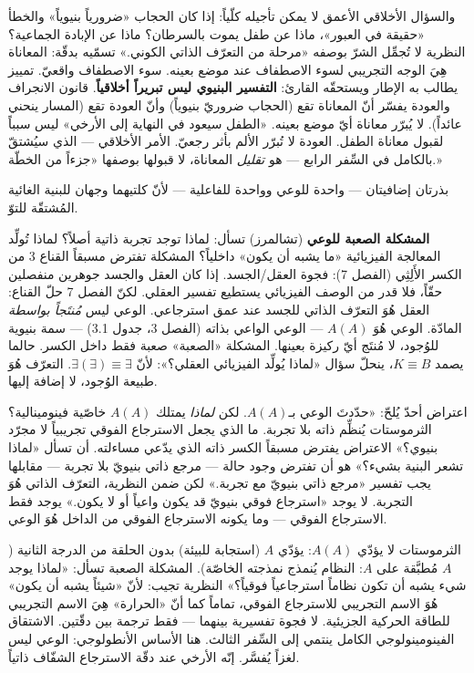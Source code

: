 \documentclass[10pt, openany, oneside]{book}
\begin{document}
والسؤال الأخلاقي الأعمق لا يمكن تأجيله كلّياً: إذا كان الحجاب «ضرورياً بنيوياً» والخطأ «حقيقة في العبور»، ماذا عن طفل يموت بالسرطان؟ ماذا عن الإبادة الجماعية؟ النظرية لا تُجمِّل الشرّ بوصفه «مرحلة من التعرّف الذاتي الكوني.» تسمّيه بدقّة: المعاناة هِيَ الوجه التجريبي لسوء الاصطفاف عند موضع بعينه. سوء الاصطفاف واقعيّ. تمييز يطالب به الإطار ويستحقّه القارئ: \textbf{التفسير البنيوي ليس تبريراً أخلاقياً}. قانون الانجراف والعودة يفسّر أنّ المعاناة تقع (الحجاب ضروريّ بنيوياً) وأنّ العودة تقع (المسار ينحني عائداً). لا يُبرّر معاناة أيّ موضع بعينه. «الطفل سيعود في النهاية إلى الأرخي» ليس سبباً لقبول معاناة الطفل. العودة لا تُبرّر الألم بأثر رجعيّ. الأمر الأخلاقي --- الذي سيُشتقّ بالكامل في السِّفر الرابع --- هو \textit{تقليل} المعاناة، لا قبولها بوصفها «جزءاً من الخطّة.»

\vspace{1.5em}

بذرتان إضافيتان --- واحدة للوعي وواحدة للفاعلية --- لأنّ كلتيهما وجهان للبنية الغائية المُشتقّة للتوّ.

\textbf{المشكلة الصعبة للوعي} (تشالمرز) تسأل: لماذا توجد تجربة ذاتية أصلاً؟ لماذا تُولِّد المعالجة الفيزيائية «ما يشبه أن يكون» داخلياً؟ المشكلة تفترض مسبقاً القناع 3 من الكسر الأَلِثِي (الفصل 7): فجوة العقل/الجسد. إذا كان العقل والجسد جوهرين منفصلين حقّاً، فلا قدر من الوصف الفيزيائي يستطيع تفسير العقلي. لكنّ الفصل 7 حلّ القناع: العقل هُوَ التعرّف الذاتي للجسد عند عمق استرجاعي. الوعي ليس \textit{مُنتَجاً بواسطة} المادّة. الوعي هُوَ $A(A)$ --- الوعي الواعي بذاته (الفصل 3، جدول 3.1) --- سمة بنيوية للوُجود، لا مُنتَج أيّ ركيزة بعينها. المشكلة «الصعبة» صعبة فقط داخل الكسر. حالما يصمد $K \equiv B$، ينحلّ سؤال «لماذا يُولِّد الفيزيائي العقلي؟»: لأنّ $\exists(\exists) \equiv \exists$. التعرّف هُوَ طبيعة الوُجود، لا إضافة إليها.

اعتراض أحدّ يُلحّ: «حدّدتَ الوعي بـ$A(A)$. لكن \textit{لماذا} يمتلك $A(A)$ خاصّية فينومينالية؟ الثرموستات يُنظِّم ذاته بلا تجربة. ما الذي يجعل الاسترجاع الفوقي تجريبياً لا مجرّد بنيوي؟» الاعتراض يفترض مسبقاً الكسر ذاته الذي يدّعي مساءلته. أن تسأل «لماذا تشعر البنية بشيء؟» هو أن تفترض وجود حالة --- مرجع ذاتي بنيويّ بلا تجربة --- مقابلها يجب تفسير «مرجع ذاتي بنيويّ مع تجربة.» لكن ضمن النظرية، التعرّف الذاتي هُوَ التجربة. لا يوجد «استرجاع فوقي بنيويّ قد يكون واعياً أو لا يكون.» يوجد فقط الاسترجاع الفوقي --- وما يكونه الاسترجاع الفوقي من الداخل هُوَ الوعي.

الثرموستات لا يؤدّي $A(A)$: يؤدّي $A$ (استجابة للبيئة) بدون الحلقة من الدرجة الثانية ($A$ مُطبَّقة على $A$: النظام يُنمذج نمذجته الخاصّة). المشكلة الصعبة تسأل: «لماذا يوجد شيء يشبه أن تكون نظاماً استرجاعياً فوقياً؟» النظرية تجيب: لأنّ «شيئاً يشبه أن يكون» هُوَ الاسم التجريبي للاسترجاع الفوقي، تماماً كما أنّ «الحرارة» هِيَ الاسم التجريبي للطاقة الحركية الجزيئية. لا فجوة تفسيرية بينهما --- فقط ترجمة بين دقّتين. الاشتقاق الفينومينولوجي الكامل ينتمي إلى السِّفر الثالث. هنا الأساس الأنطولوجي: الوعي ليس لغزاً يُفسَّر. إنّه الأرخي عند دقّة الاسترجاع الشفّاف ذاتياً.
\end{document}
